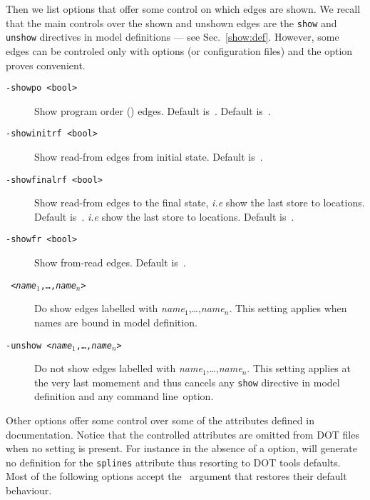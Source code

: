 Then we list options that offer some control on which edges are shown.
We recall that the main controls over the shown and unshown edges are
the \verb+show+ and \verb+unshow+ directives in model definitions ---
see Sec.~\ref{show:def}.
However, some edges can be controled only with options (or configuration
files) and the  option proves convenient.
\begin{description}
\item[{\tt -showpo <bool>}] Show program order () edges.
Default is~.
Default is~.
\item[{\tt -showinitrf <bool>}] Show read-from edges from initial state.
Default is~.
\item[{\tt -showfinalrf <bool>}] Show read-from edges to the final state,
\emph{i.e} show the last store to locations. Default is~.
\emph{i.e} show the last store to locations. Default is~.
\item[{\tt -showfr <bool>}] Show from-read edges. Default is~.
\item[{\tt {} <\textit{name}$_1$,\ldots,\textit{name}$_n$>}]
Do show edges labelled with \textit{name}$_1$,\ldots,\textit{name}$_n$.
This setting applies when names are bound in model definition.
\item[{\tt -unshow <\textit{name}$_1$,\ldots,\textit{name}$_n$>}]
Do not show edges labelled with \textit{name}$_1$,\ldots,\textit{name}$_n$.
This setting applies at the very last momement and thus cancels any
\verb+show+ directive in model definition and any  command
line~option.
\end{description}
Other options offer some control over some of the attributes defined in
 documentation.
Notice that the controlled attributes are omitted from DOT files
when no setting is present.
For instance in the absence of a  option, \herd{}
will generate no definition for the \texttt{splines} attribute thus
resorting to DOT tools defaults.
Most of the following
options accept the ~argument that restores their
default behaviour.
